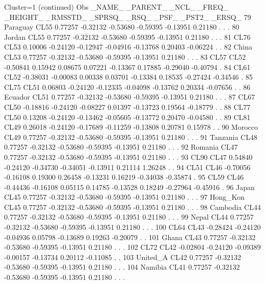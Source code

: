 \documentclass{article}
\begin{document}
\begin{Woutput}
Cluster=1
(continued)
Obs _NAME_   _PARENT_   _NCL_   _FREQ_  _HEIGHT_ _RMSSTD_  _SPRSQ_  _RSQ_    _PSF_   _PST2_  _ERSQ_
 79 Paraguay   CL55    0.77257 -0.32132 -0.53680 -0.59395 -0.13951 0.21180   .        .         .
 80 Jordan     CL55    0.77257 -0.32132 -0.53680 -0.59395 -0.13951 0.21180   .        .         .
 81 CL76       CL53    0.10006 -0.24120 -0.12947 -0.04916 -0.13768 0.20403 -0.06224   .         .
 82 China      CL53    0.77257 -0.32132 -0.53680 -0.59395 -0.13951 0.21180   .        .         .
 83 CL57       CL52   -0.50841  0.15942  0.08675  0.07221 -0.13367 0.17885 -0.29040 -0.40794    .
 84 CL61       CL52   -0.38031 -0.00083  0.00338  0.03701 -0.13384 0.18535 -0.27424 -0.34546    .
 85 CL75       CL51    0.06803 -0.24120 -0.12335 -0.04098 -0.13762 0.20334 -0.07656   .         .
 86 Ecuador    CL51    0.77257 -0.32132 -0.53680 -0.59395 -0.13951 0.21180   .        .         .
 87 CL67       CL50   -0.18816 -0.24120 -0.08227  0.01397 -0.13723 0.19564 -0.18779   .         .
 88 CL77       CL50    0.13208 -0.24120 -0.13462 -0.05605 -0.13772 0.20470 -0.04580   .         .
 89 CL81       CL49    0.26018 -0.24120 -0.17689 -0.11259 -0.13808 0.20781  0.15978   .         .
 90 Morocco    CL49    0.77257 -0.32132 -0.53680 -0.59395 -0.13951 0.21180   .        .         .
 91 Tanzania   CL48    0.77257 -0.32132 -0.53680 -0.59395 -0.13951 0.21180   .        .         .
 92 Romania    CL47    0.77257 -0.32132 -0.53680 -0.59395 -0.13951 0.21180   .        .         .
 93 CL90       CL47    0.54840 -0.24120 -0.34730 -0.34051 -0.13911 0.21114  1.26248   .         .
 94 CL51       CL46   -0.70056 -0.16108  0.19300  0.26458 -0.13231 0.16219 -0.34038 -0.35874    .
 95 CL59       CL46   -0.44436 -0.16108  0.05115  0.14785 -0.13528 0.18249 -0.27964 -0.45916    .
 96 Japan      CL45    0.77257 -0.32132 -0.53680 -0.59395 -0.13951 0.21180   .        .         .
 97 Hong_Kon   CL45    0.77257 -0.32132 -0.53680 -0.59395 -0.13951 0.21180   .        .         .
 98 Cambodia   CL44    0.77257 -0.32132 -0.53680 -0.59395 -0.13951 0.21180   .        .         .
 99 Nepal      CL44    0.77257 -0.32132 -0.53680 -0.59395 -0.13951 0.21180   .        .         .
100 CL64       CL43   -0.28424 -0.24120 -0.04936  0.05798 -0.13689 0.19263 -0.20079   .         .
101 Ghana      CL43    0.77257 -0.32132 -0.53680 -0.59395 -0.13951 0.21180   .        .         .
102 CL72       CL42   -0.02804 -0.24120 -0.09389 -0.00157 -0.13734 0.20112 -0.11085   .         .
103 United_A   CL42    0.77257 -0.32132 -0.53680 -0.59395 -0.13951 0.21180   .        .         .
104 Namibia    CL41    0.77257 -0.32132 -0.53680 -0.59395 -0.13951 0.21180   .        .         .

\end{Woutput}
\end{document}
